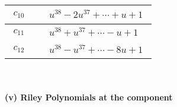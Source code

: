 \documentclass[1p]{elsarticle_modified}
\theoremstyle{definition}
\begin{document}
\begin{tabular}{m{50pt}|m{274pt}}
\hline $$\begin{aligned}c_{10}\end{aligned}$$&$\begin{aligned}
&u^{38}-2 u^{37}+\cdots+u+1
\end{aligned}$\\
\hline $$\begin{aligned}c_{11}\end{aligned}$$&$\begin{aligned}
&u^{38}+u^{37}+\cdots- u+1
\end{aligned}$\\
\hline $$\begin{aligned}c_{12}\end{aligned}$$&$\begin{aligned}
&u^{38}- u^{37}+\cdots-8 u+1
\end{aligned}$\\
\hline
\end{tabular}\\~\\
\newpage\renewcommand{\arraystretch}{1}
\flushleft \textbf{(v) Riley Polynomials at the component}\newline \\
\end{document}
